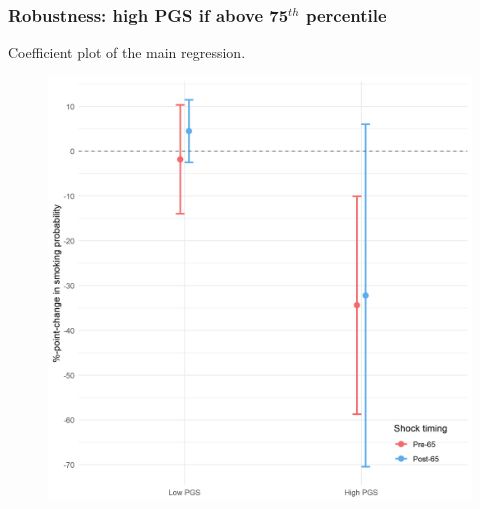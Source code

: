 \documentclass[10pt,compress,xcolor=dvipsnames,aspectratio=169]{beamer}    %
\newcounter{ex}
\newcommand{\1}[1]{\mathrm{1\hspace*{-2.5pt}l}[#1]}	%
\begin{document}
\begin{frame}
\frametitle{Robustness: high PGS if above 75$^{th}$ percentile}
Coefficient plot of the main regression.
\begin{figure}[hbtp]
\centering
\includegraphics[height=0.8\textheight]{../../3_output/shock_effects/robustness_6070__75pt_cvplot.png}
\label{fig:coeffplot75highPGS}
\end{figure}
\hyperlink{frame:robustness}{}
\end{frame}
\end{document}
